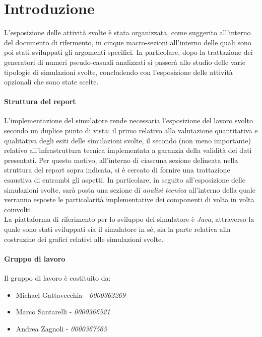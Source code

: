 \chapter{Introduzione}
\label{ch:intro}

L'esposizione delle attivit\`a svolte \`e stata organizzata, come suggerito all'interno del documento di rifermento, in cinque macro-sezioni all'interno delle quali sono poi stati sviluppati gli argomenti specifici.
In particolare, dopo la trattazione dei generatori di numeri pseudo-casuali analizzati si passer\`a allo studio delle varie tipologie di simulazioni svolte, concludendo con l'esposizione delle attivit\`a opzionali che sono state scelte.

\subsubsection{Struttura del report}

L'implementazione del simulatore rende necessaria l'esposizione del lavoro svolto secondo un duplice punto di vista: il primo relativo alla valutazione quantitativa e qualitativa degli esiti delle simulazioni svolte, il secondo (non meno importante) relativo all'infrastruttura tecnica implementata a garanzia della validit\`a dei dati presentati. Per questo motivo, all'interno di ciascuna sezione delineata nella struttura del report sopra indicata, si \`e cercato di fornire una trattazione esaustiva di entrambi gli aspetti. In particolare, in seguito all'esposizione delle simulazioni svolte, sar\`a posta una sezione di \emph{analisi tecnica} all'interno della quale verranno esposte le particolarit\`a implementative dei componenti di volta in volta coinvolti.
\\

La piattaforma di riferimento per lo sviluppo del simulatore \`e \emph{Java}, attraverso la quale sono stati sviluppati sia il simulatore in s\'e, sia la parte relativa alla costruzine dei grafici relativi alle simulazioni svolte.

\newpage
\subsubsection{Gruppo di lavoro}

Il gruppo di lavoro \`e costituito da:
\begin{itemize}
\item Michael Gattavecchia - \emph{0000362269}	
\item Marco Santarelli - \emph{0000366521}	
\item Andrea Zagnoli - \emph{0000367565}
\end{itemize}
